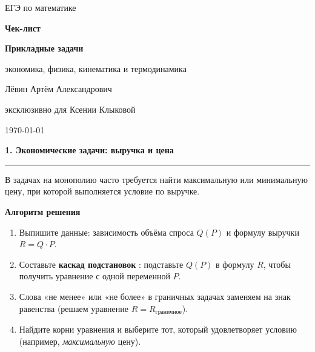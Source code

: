 \documentclass[a4paper,12pt]{article}
\newcommand{\SectionTitle}[1]{%
  \vspace{0.8em}
  {\Large\bfseries\textcolor{darkaccent}{#1}}\par
  \vspace{0.2em}
  {\color{accent}\rule{\linewidth}{0.8pt}}
  \vspace{0.4em}
}
\newcommand{\MiniTitle}[1]{%
  \vspace{0.45em}
  {\bfseries\textcolor{darkaccent}{#1}}\par
}
\newcommand{\Important}[1]{%
  \textcolor{darkaccent}{\bfseries #1}
}
\begin{document}
\begin{titlepage}
\centering
\vspace*{28mm}

{\Large\textcolor{darkaccent}{ЕГЭ по математике}\par}
\vspace{16mm}

{\fontsize{25}{30}\selectfont\bfseries Чек-лист\par}
\vspace{5mm}
{\Large\bfseries Прикладные задачи\par}
\vspace{3mm}
{\large экономика, физика, кинематика и термодинамика\par}

\vspace{22mm}

{\large Лёвин Артём Александрович\par}
\vspace{2mm}
{\large эксклюзивно для Ксении Клыковой\par}

\vspace{18mm}

{\large \today\par}

\vfill


\end{titlepage}

\SectionTitle{1. Экономические задачи: выручка и цена}

В задачах на монополию часто требуется найти максимальную или минимальную цену, при которой выполняется условие по выручке.

\MiniTitle{Алгоритм решения}
\begin{enumerate}
\item Выпишите данные: зависимость объёма спроса $Q(P)$ и формулу выручки $R = Q \cdot P$.
\item Составьте \Important{каскад подстановок}: подставьте $Q(P)$ в формулу $R$, чтобы получить уравнение с одной переменной $P$.
\item Слова «не менее» или «не более» в граничных задачах заменяем на знак равенства (решаем уравнение $R = R_{\text{граничное}}$).
\item Найдите корни уравнения и выберите тот, который удовлетворяет условию (например, \textit{максимальную} цену).
\end{enumerate}
\end{document}
